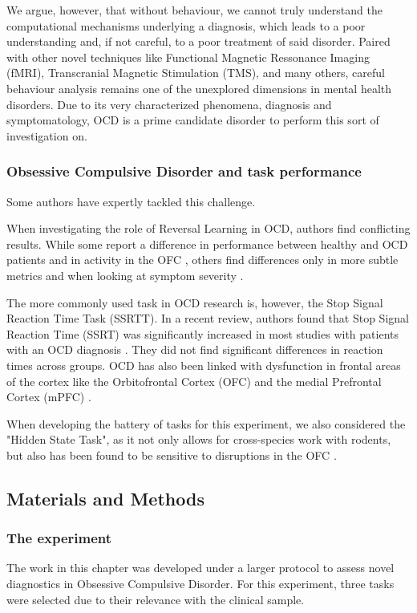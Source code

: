 \documentclass[11pt]{article}
\begin{document}
We argue, however, that without behaviour, we cannot truly understand the computational mechanisms underlying a diagnosis, which leads to a poor understanding and, if not careful, to a poor treatment of said disorder.
Paired with other novel techniques like Functional Magnetic Ressonance Imaging (fMRI), Transcranial Magnetic Stimulation (TMS), and many others, careful behaviour analysis remains one of the unexplored dimensions in mental health disorders.
Due to its very characterized phenomena, diagnosis and symptomatology, OCD is a prime candidate disorder to perform this sort of investigation on.

\subsubsection{Obsessive Compulsive Disorder and task performance}
Some authors have expertly tackled this challenge.

When investigating the role of Reversal Learning in OCD, authors find conflicting results. While some report a difference in performance between healthy and OCD patients and in activity in the OFC \cite{remijnse2006reduced}, others find differences only in more subtle metrics and when looking at symptom severity \cite{valerius2008reversal}.

The more commonly used task in OCD research is, however, the Stop Signal Reaction Time Task (SSRTT). In a recent review, authors found that Stop Signal Reaction Time (SSRT) was significantly increased in most studies with patients with an OCD diagnosis \cite{mar2022obsessive}. They did not find significant differences in reaction times across groups. OCD has also been linked with dysfunction in frontal areas of the cortex like the Orbitofrontal Cortex (OFC) and the medial Prefrontal Cortex (mPFC) \cite{aron2003stop}.

When developing the battery of tasks for this experiment, we also considered the "Hidden State Task", as it not only allows for cross-species work with rodents, but also has been found to be sensitive to disruptions in the OFC \cite{vertechi2020inference}.

\subsection{Materials and Methods}
\subsubsection{The experiment}
The work in this chapter was developed under a larger protocol to assess novel diagnostics in Obsessive Compulsive Disorder. For this experiment, three tasks were selected due to their relevance with the clinical sample.
\end{document}

